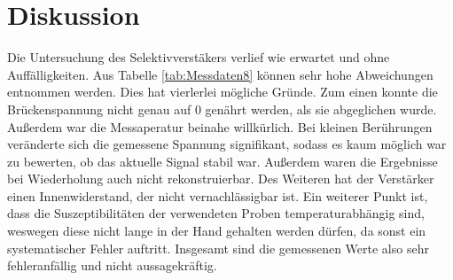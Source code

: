 \section{Diskussion}
\label{sec:Diskussion}

Die Untersuchung des Selektivverstäkers verlief wie erwartet 
und ohne Auffälligkeiten. 
Aus Tabelle \ref{tab:Messdaten8} können sehr hohe Abweichungen 
entnommen werden. Dies hat vierlerlei mögliche Gründe. 
Zum einen konnte die Brückenspannung nicht genau auf 0 genährt 
werden, als sie abgeglichen wurde. Außerdem war die 
Messaperatur beinahe willkürlich. Bei kleinen Berührungen veränderte 
sich die gemessene Spannung signifikant, sodass es kaum möglich war
zu bewerten, ob das aktuelle Signal stabil war. Außerdem waren die 
Ergebnisse bei Wiederholung auch nicht rekonstruierbar. Des Weiteren
hat der Verstärker einen Innenwiderstand, der nicht vernachlässigbar ist. 
Ein weiterer Punkt ist, dass die Suszeptibilitäten der verwendeten Proben
temperaturabhängig sind, weswegen diese nicht lange in der Hand 
gehalten werden dürfen, da sonst ein systematischer Fehler auftritt. 
Insgesamt sind die gemessenen Werte also sehr fehleranfällig und 
nicht aussagekräftig. 

